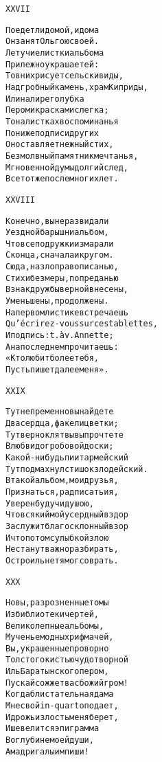 \begin{minipage}[t]{\dimexpr 0.5\textwidth -\tabcolsep-.5pt}
\begin{alltt}\normalfont\centering
XXVII

Поедет ли домой, и дома
Он занят Ольгою своей.
Летучие листки альбома
Прилежно украшает ей:
То в них рисует сельски виды,
Надгробный камень, храм Киприды,
Или на лире голубка
Пером и красками слегка;
То на листках воспоминанья
Пониже подписи других
Он оставляет нежный стих,
Безмолвный памятник мечтанья,
Мгновенной думы долгий след,
Все тот же после многих лет.
\end{alltt}
\end{minipage}

\begin{minipage}[t]{\dimexpr 0.5\textwidth -\tabcolsep-.5pt}
\begin{alltt}\normalfont\centering
XXVIII

Конечно, вы не раз видали
Уездной барышни альбом,
Что все подружки измарали
С конца, с начала и кругом.
Сюда, назло правописанью,
Стихи без меры, по преданью
В знак дружбы верной внесены,
Уменьшены, продолжены.
На первом листике встречаешь
Qu'écrirez-vous sur ces tablettes,
И подпись: t. à v. Annette;
А на последнем прочитаешь:
«Кто любит более тебя,
Пусть пишет далее меня».
\end{alltt}
\end{minipage}
\clearpage

\begin{minipage}[t]{\dimexpr 0.5\textwidth -\tabcolsep-.5pt}
\begin{alltt}\normalfont\centering
XXIX

Тут непременно вы найдете
Два сердца, факел и цветки;
Тут верно клятвы вы прочтете
В любви до гробовой доски;
Какой-нибудь пиит армейский
Тут подмахнул стишок злодейский.
В такой альбом, мои друзья,
Признаться, рад писать и я,
Уверен будучи душою,
Что всякий мой усердный вздор
Заслужит благосклонный взор
И что потом с улыбкой злою
Не станут важно разбирать,
Остро иль нет я мог соврать.
\end{alltt}
\end{minipage}

\begin{minipage}[t]{\dimexpr 0.5\textwidth -\tabcolsep-.5pt}
\begin{alltt}\normalfont\centering
XXX

Но вы, разрозненные томы
Из библиотеки чертей,
Великолепные альбомы,
Мученье модных рифмачей,
Вы, украшенные проворно
Толстого кистью чудотворной
Иль Баратынского пером,
Пускай сожжет вас божий гром!
Когда блистательная дама
Мне свой in-quarto подает,
И дрожь и злость меня берет,
И шевелится эпиграмма
Во глубине моей души,
А мадригалы им пиши!
\end{alltt}
\end{minipage}
\clearpage

